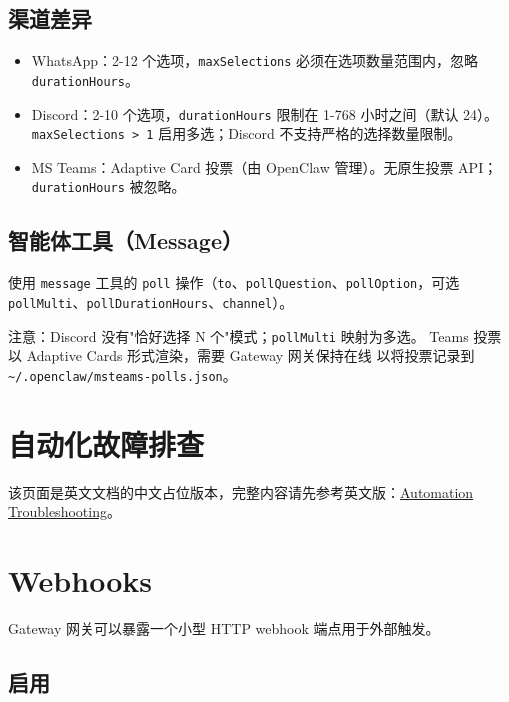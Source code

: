 \subsection{渠道差异}


\begin{itemize}
  \item WhatsApp：2-12 个选项，\texttt{maxSelections} 必须在选项数量范围内，忽略 \texttt{durationHours}。
  \item Discord：2-10 个选项，\texttt{durationHours} 限制在 1-768 小时之间（默认 24）。\texttt{maxSelections > 1} 启用多选；Discord 不支持严格的选择数量限制。
  \item MS Teams：Adaptive Card 投票（由 OpenClaw 管理）。无原生投票 API；\texttt{durationHours} 被忽略。
\end{itemize}


\subsection{智能体工具（Message）}


使用 \texttt{message} 工具的 \texttt{poll} 操作（\texttt{to}、\texttt{pollQuestion}、\texttt{pollOption}，可选 \texttt{pollMulti}、\texttt{pollDurationHours}、\texttt{channel}）。

注意：Discord 没有"恰好选择 N 个"模式；\texttt{pollMulti} 映射为多选。
Teams 投票以 Adaptive Cards 形式渲染，需要 Gateway 网关保持在线
以将投票记录到 \texttt{\textasciitilde{}/.openclaw/msteams-polls.json}。


\clearpage

\section{自动化故障排查}


该页面是英文文档的中文占位版本，完整内容请先参考英文版：\href{/automation/troubleshooting}{Automation Troubleshooting}。


\clearpage

\section{Webhooks}


Gateway 网关可以暴露一个小型 HTTP webhook 端点用于外部触发。

\subsection{启用}


